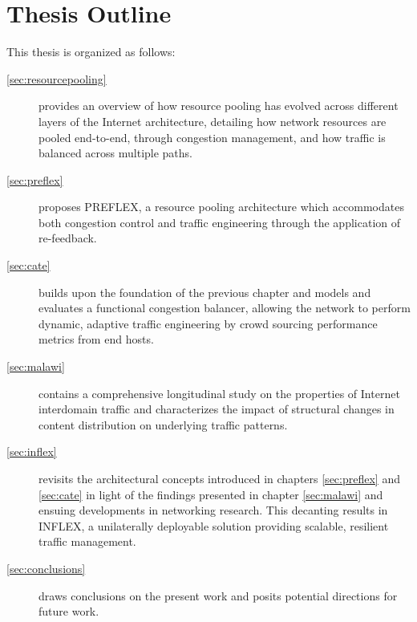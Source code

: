 \section{Thesis Outline}
\label{sec:introduction:outline}

This thesis is organized as follows:

\renewcommand{\descriptionlabel}[1]{\hspace{\labelsep}\textbf{Chapter #1}}
\begin{description}
\item[\ref{sec:resourcepooling}] provides an overview of how resource pooling has evolved across different layers of the Internet architecture, detailing how network resources are pooled end-to-end, through congestion management, and how traffic is balanced across multiple paths.
\item[\ref{sec:preflex}] proposes \acs{PREFLEX}, a resource pooling architecture which accommodates both congestion control and traffic engineering through the application of re-feedback. 
\item[\ref{sec:cate}] builds upon the foundation of the previous chapter and models and evaluates a functional congestion balancer, allowing the network to perform dynamic, adaptive traffic engineering by crowd sourcing performance metrics from end hosts.
\item[\ref{sec:malawi}] contains a comprehensive longitudinal study on the properties of Internet interdomain traffic and characterizes the impact of structural changes in content distribution on underlying traffic patterns.
\item[\ref{sec:inflex}] revisits the architectural concepts introduced in chapters \ref{sec:preflex} and \ref{sec:cate} in light of the findings presented in chapter \ref{sec:malawi} and ensuing developments in networking research. This decanting results in INFLEX, a unilaterally deployable solution providing scalable, resilient traffic management.
\item[\ref{sec:conclusions}] draws conclusions on the present work and posits potential directions for future work.
\end{description}

